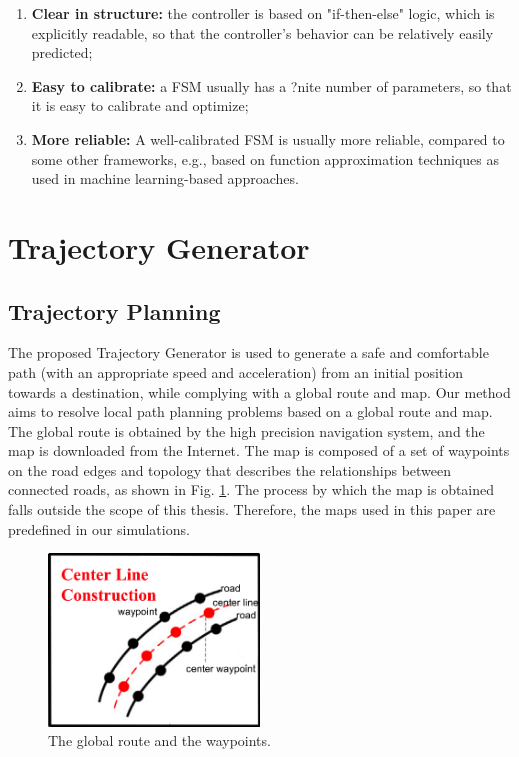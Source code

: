 \begin{enumerate}
\item \textbf {Clear in structure:} the controller is based on "if-then-else" logic, which is explicitly readable, so that the controller's behavior can be relatively easily predicted; 
\item \textbf {Easy to calibrate:} a FSM usually has a ?nite number of parameters, so that it is easy to calibrate and optimize;
\item \textbf {More reliable:} A well-calibrated FSM is usually more reliable, compared to some other frameworks, e.g., based on function approximation techniques as used in machine learning-based approaches.  
\end{enumerate}

\section{Trajectory Generator}

\subsection{Trajectory Planning}

The proposed Trajectory Generator is used to generate a safe and comfortable path (with an appropriate speed and acceleration) from an initial position towards a destination, while complying with a global route and map. Our method aims to resolve local path planning problems based on a global route and map. The global route is obtained by the high precision navigation system, and the map is downloaded from the Internet. The map is composed of a set of waypoints on the road edges and topology that describes the relationships between connected roads, as shown in Fig. \ref{fig:center-line}. The process by which the map is obtained falls outside the scope of this thesis. Therefore, the maps used in this paper are predefined in our simulations.

\begin{figure}[h]
\centering
\includegraphics[width=0.5\textwidth]{figs/ch3/center-line}
\caption{The global route and the waypoints.}
\label{fig:center-line}
\end{figure}

